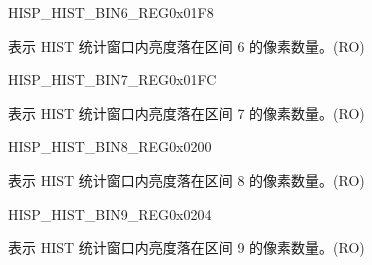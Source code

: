 \begin{register}{H}{ISP\_HIST\_BIN6\_REG}{0x01F8}\label{regdesc:ISPHISTBIN6REG}
%
%
\regnewline%
\begin{regdesc}\begin{reglist}
\label{fielddesc:ISPHISTBIN6}\item [ISP\_HIST\_BIN\_6] 表示 HIST 统计窗口内亮度落在区间 6 的像素数量。(RO)
\end{reglist}\end{regdesc}
\end{register}


\begin{register}{H}{ISP\_HIST\_BIN7\_REG}{0x01FC}\label{regdesc:ISPHISTBIN7REG}
%
%
\regnewline%
\begin{regdesc}\begin{reglist}
\label{fielddesc:ISPHISTBIN7}\item [ISP\_HIST\_BIN\_7] 表示 HIST 统计窗口内亮度落在区间 7 的像素数量。(RO)
\end{reglist}\end{regdesc}
\end{register}


\begin{register}{H}{ISP\_HIST\_BIN8\_REG}{0x0200}\label{regdesc:ISPHISTBIN8REG}
%
%
\regnewline%
\begin{regdesc}\begin{reglist}
\label{fielddesc:ISPHISTBIN8}\item [ISP\_HIST\_BIN\_8] 表示 HIST 统计窗口内亮度落在区间 8 的像素数量。(RO)
\end{reglist}\end{regdesc}
\end{register}


\begin{register}{H}{ISP\_HIST\_BIN9\_REG}{0x0204}\label{regdesc:ISPHISTBIN9REG}
%
%
\regnewline%
\begin{regdesc}\begin{reglist}
\label{fielddesc:ISPHISTBIN9}\item [ISP\_HIST\_BIN\_9] 表示 HIST 统计窗口内亮度落在区间 9 的像素数量。(RO)
\end{reglist}\end{regdesc}
\end{register}


